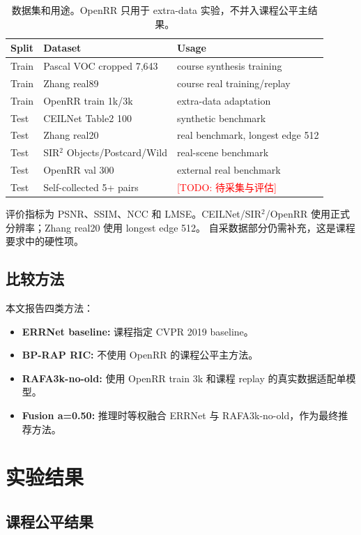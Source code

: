 \documentclass{article}
\newcommand{\todo}[1]{\textcolor{red}{[TODO: #1]}}
\begin{document}
\begin{table}[!htbp]
\centering
\caption{数据集和用途。OpenRR 只用于 extra-data 实验，不并入课程公平主结果。}
\label{tab:datasets}
\begin{tabular}{lll}
\toprule
Split & Dataset & Usage \\
\midrule
Train & Pascal VOC cropped 7,643 & course synthesis training \\
Train & Zhang real89 & course real training/replay \\
Train & OpenRR train 1k/3k & extra-data adaptation \\
Test & CEILNet Table2 100 & synthetic benchmark \\
Test & Zhang real20 & real benchmark, longest edge 512 \\
Test & SIR$^2$ Objects/Postcard/Wild & real-scene benchmark \\
Test & OpenRR val 300 & external real benchmark \\
Test & Self-collected 5+ pairs & \todo{待采集与评估} \\
\bottomrule
\end{tabular}
\end{table}

评价指标为 PSNR、SSIM、NCC 和 LMSE。CEILNet/SIR$^2$/OpenRR 使用正式分辨率；Zhang real20 使用 longest edge 512。
自采数据部分仍需补充，这是课程要求中的硬性项。

\subsection{比较方法}

本文报告四类方法：
\begin{itemize}
  \item \textbf{ERRNet baseline:} 课程指定 CVPR 2019 baseline。
  \item \textbf{BP-RAP RIC:} 不使用 OpenRR 的课程公平主方法。
  \item \textbf{RAFA3k-no-old:} 使用 OpenRR train 3k 和课程 replay 的真实数据适配单模型。
  \item \textbf{Fusion a=0.50:} 推理时等权融合 ERRNet 与 RAFA3k-no-old，作为最终推荐方法。
\end{itemize}

\section{实验结果}

\subsection{课程公平结果}
\end{document}
